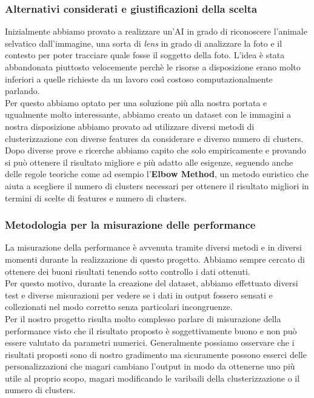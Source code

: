 \documentclass[12pt,a4paper,twoside]{article}
\begin{document}
\subsubsection*{Alternativi considerati e giustificazioni della scelta}
Inizialmente abbiamo provato a realizzare un'AI in grado di riconoscere l'animale selvatico 
dall'immagine, una sorta di \textit{lens} in grado di analizzare la foto e il contesto per poter 
tracciare quale fosse il soggetto della foto. L'idea è stata abbandonata piuttosto velocemente 
perchè le risorse a disposizione erano molto inferiori a quelle richieste da un lavoro così 
costoso computazionalmente parlando.\\
Per questo abbiamo optato per una soluzione più alla nostra portata e ugualmente molto 
interessante, abbiamo creato un dataset con le immagini a nostra disposizione abbiamo provato 
ad utilizzare diversi metodi di clusterizzazione con diverse features da considerare e diverso 
numero di clusters.\\
Dopo diverse prove e ricerche abbiamo capito che solo empiricamente e provando si può ottenere 
il risultato migliore e più adatto alle esigenze, seguendo anche delle regole teoriche come ad 
esempio l'\textbf{Elbow Method}, un metodo euristico che aiuta a scegliere il numero di 
clusters necessari per ottenere il risultato migliori in termini di scelte di features e numero 
di clusters.\\
\subsubsection*{Metodologia per la misurazione delle performance}
La misurazione della performance è avvenuta tramite diversi metodi e in diversi momenti durante la 
realizzazione di questo progetto. Abbiamo sempre cercato di ottenere dei buoni risultati tenendo 
sotto controllo i dati ottenuti.\\
Per questo motivo, durante la creazione del dataset, abbiamo effettuato diversi test e diverse 
misurazioni per vedere se i dati in output fossero sensati e collezionati nel modo corretto senza 
particolari incongruenze.\\
Per il nostro progetto risulta molto complesso parlare di misurazione della performance visto che 
il risultato proposto è soggettivamente buono e non può essere valutato da parametri numerici. 
Generalmente possiamo osservare che i risultati proposti sono di nostro gradimento ma sicuramente 
possono esserci delle personalizzazioni che magari cambiano l'output in modo da ottenerne uno più 
utile al proprio scopo, magari modificando le varibaili della clusterizzazione o il numero di 
clusters.
\end{document}
